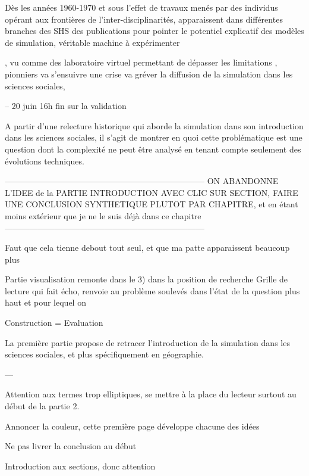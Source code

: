 Dès les années 1960-1970 et sous l'effet de travaux menés par des individus opérant aux frontières de l'inter-disciplinarités, apparaissent dans différentes branches des SHS des publications pour pointer le potentiel explicatif des modèles de simulation, véritable machine à expérimenter 

,  vu comme des laboratoire virtuel permettant de dépasser les limitations  ,  pionniers va s'ensuivre une crise va gréver la diffusion de la simulation dans les sciences sociales, 

--
20 juin 16h fin sur la validation 


A partir d'une relecture historique qui aborde la simulation dans son introduction dans les sciences sociales, il s'agit de montrer en quoi cette problématique est une question dont la complexité ne peut être analysé en tenant compte seulement des évolutions techniques.	

------------------------------------------------------------------------
ON ABANDONNE L'IDEE de la PARTIE INTRODUCTION AVEC CLIC SUR SECTION, FAIRE UNE CONCLUSION SYNTHETIQUE PLUTOT PAR CHAPITRE, et en étant moins extérieur que je ne le suis déjà dans ce chapitre
------------------------------------------------------------------------



Faut que cela tienne debout tout seul, et que ma patte apparaissent beaucoup plus 

Partie visualisation remonte dans le 3) dans la position de recherche
Grille de lecture qui fait écho, renvoie au problème soulevés dans l'état de la question plus haut et pour lequel on 






Construction = Evaluation

La première partie propose de retracer l'introduction de la simulation dans les sciences sociales, et plus spécifiquement en géographie. 




---

Attention aux termes trop elliptiques, se mettre à la place du lecteur surtout au début de la partie 2.

Annoncer la couleur, cette première page développe chacune des idées 


Ne pas livrer la conclusion au début 

Introduction aux sections, donc attention 



\printbibliography[heading=subbibliography]

\stopcontents[chapters]
